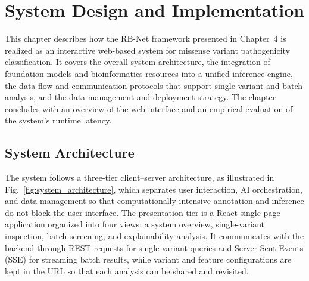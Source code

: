 \providecommand{\tbd}{\underline{\hspace{1.2cm}}}

\chapter{System Design and Implementation}
\label{chap:system_design}

This chapter describes how the RB-Net framework presented in Chapter~4 is realized as an interactive web-based system for missense variant pathogenicity classification. It covers the overall system architecture, the integration of foundation models and bioinformatics resources into a unified inference engine, the data flow and communication protocols that support single-variant and batch analysis, and the data management and deployment strategy. The chapter concludes with an overview of the web interface and an empirical evaluation of the system's runtime latency.

\section{System Architecture}
\label{sec:system_architecture}

The system follows a three-tier client--server architecture, as illustrated in Fig.~\ref{fig:system_architecture}, which separates user interaction, AI orchestration, and data management so that computationally intensive annotation and inference do not block the user interface. The presentation tier is a React single-page application organized into four views: a system overview, single-variant inspection, batch screening, and explainability analysis. It communicates with the backend through REST requests for single-variant queries and Server-Sent Events (SSE) for streaming batch results, while variant and feature configurations are kept in the URL so that each analysis can be shared and revisited.

